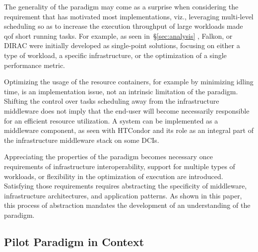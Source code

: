 \documentclass{sig-alternate}
\begin{document}
The generality of the \pilot paradigm may come as a surprise when considering
the requirement that has motivated most implementations, viz., leveraging
multi-level scheduling so as to increase the execution throughput of large
workloads made qof short running tasks.  For example, as seen
in~\S\ref{sec:analysis} \panda, Falkon, or DIRAC were initially developed as
single-point solutions, focusing on either a type of workload, a specific
infrastructure, or the optimization of a single performance metric.

Optimizing the usage of the resource containers, for example by minimizing
idling time, is an implementation issue, not an intrinsic limitation of the
\pilot paradigm.  Shifting the control over tasks scheduling away from the
infrastructure middleware does not imply that the end-user will become
necessarily responsible for an efficient resource utilization. A \pilot system
can be implemented as a middleware component, as seen with HTCondor and its role
as an integral part of the infrastructure middleware stack on some DCIs.

Appreciating the properties of the \pilot paradigm becomes necessary once
requirements of infrastructure interoperability, support for multiple types of
workloads, or flexibility in the optimization of execution are introduced.
Satisfying those requirements requires abstracting the specificity of
middleware, infrastructure architectures, and application patterns. As shown in
this paper, this process of abstraction mandates the development of an
understanding of the \pilot paradigm.

 



%
\subsection{Pilot Paradigm in Context}
\label{sec:context}
\end{document}
